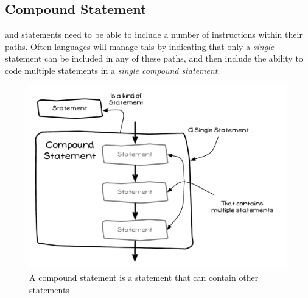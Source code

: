 \clearpage
\subsection{Compound Statement} %
\label{sub:compound_statement}

 and  statements need to be able to include a number of instructions within their paths. Often languages will manage this by indicating that only a \emph{single} statement can be included in any of these paths, and then include the ability to code multiple statements in a \emph{single compound statement}.

\begin{figure}[h]
   \centering
   \includegraphics[width=\textwidth]{./topics/control-flow/diagrams/CompoundStatement} 
   \caption{A compound statement is a statement that can contain other statements}
   \label{fig:branching-compound-statement}
\end{figure}


